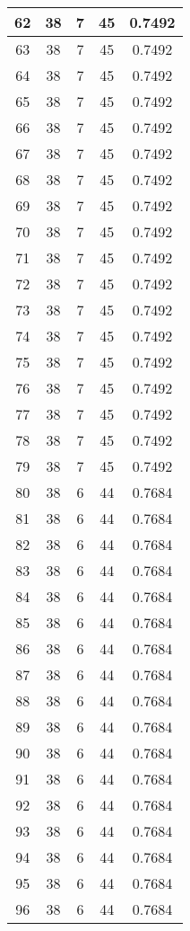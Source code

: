 \documentclass[letterpaper, 12pt]{article}
\begin{document}
\begin{longtable}{|c|c|c|c|c|}
\hline
62 & 38 & 7 & 45 & 0.7492 \\
\hline
63 & 38 & 7 & 45 & 0.7492 \\
\hline
64 & 38 & 7 & 45 & 0.7492 \\
\hline
65 & 38 & 7 & 45 & 0.7492 \\
\hline
66 & 38 & 7 & 45 & 0.7492 \\
\hline
67 & 38 & 7 & 45 & 0.7492 \\
\hline
68 & 38 & 7 & 45 & 0.7492 \\
\hline
69 & 38 & 7 & 45 & 0.7492 \\
\hline
70 & 38 & 7 & 45 & 0.7492 \\
\hline
71 & 38 & 7 & 45 & 0.7492 \\
\hline
72 & 38 & 7 & 45 & 0.7492 \\
\hline
73 & 38 & 7 & 45 & 0.7492 \\
\hline
74 & 38 & 7 & 45 & 0.7492 \\
\hline
75 & 38 & 7 & 45 & 0.7492 \\
\hline
76 & 38 & 7 & 45 & 0.7492 \\
\hline
77 & 38 & 7 & 45 & 0.7492 \\
\hline
78 & 38 & 7 & 45 & 0.7492 \\
\hline
79 & 38 & 7 & 45 & 0.7492 \\
\hline
80 & 38 & 6 & 44 & 0.7684 \\
\hline
81 & 38 & 6 & 44 & 0.7684 \\
\hline
82 & 38 & 6 & 44 & 0.7684 \\
\hline
83 & 38 & 6 & 44 & 0.7684 \\
\hline
84 & 38 & 6 & 44 & 0.7684 \\
\hline
85 & 38 & 6 & 44 & 0.7684 \\
\hline
86 & 38 & 6 & 44 & 0.7684 \\
\hline
87 & 38 & 6 & 44 & 0.7684 \\
\hline
88 & 38 & 6 & 44 & 0.7684 \\
\hline
89 & 38 & 6 & 44 & 0.7684 \\
\hline
90 & 38 & 6 & 44 & 0.7684 \\
\hline
91 & 38 & 6 & 44 & 0.7684 \\
\hline
92 & 38 & 6 & 44 & 0.7684 \\
\hline
93 & 38 & 6 & 44 & 0.7684 \\
\hline
94 & 38 & 6 & 44 & 0.7684 \\
\hline
95 & 38 & 6 & 44 & 0.7684 \\
\hline
96 & 38 & 6 & 44 & 0.7684 \\

\end{longtable}
\end{document}
